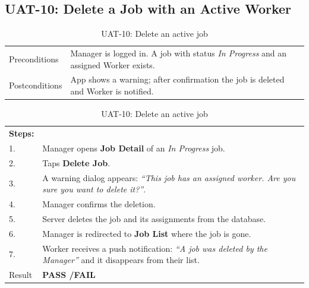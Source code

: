 \subsection*{UAT-10: Delete a Job with an Active Worker}
\begin{table}[H]
  \centering
  \begin{tabularx}{\textwidth}{lX}
    \toprule
    Preconditions  & Manager is logged in. A job with status \textit{In Progress} and an assigned Worker exists. \\
    Postconditions & App shows a warning; after confirmation the job is deleted and Worker is notified. \\
    \midrule
  \end{tabularx}
  \begin{tabularx}{\textwidth}{lX}
    \textbf{Steps:} & \\
    1. & Manager opens \textbf{Job Detail} of an \textit{In Progress} job. \\
    2. & Taps \textbf{Delete Job}. \\
    3. & A warning dialog appears: \textit{``This job has an assigned worker. Are you sure you want to delete it?''}. \\
    4. & Manager confirms the deletion. \\
    5. & Server deletes the job and its assignments from the database. \\
    6. & Manager is redirected to \textbf{Job List} where the job is gone. \\
    7. & Worker receives a push notification: \textit{``A job was deleted by the Manager''} and it disappears from their list. \\
    \midrule
    Result & \textbf{PASS \quad/\quad FAIL} \\
    \bottomrule
  \end{tabularx}
  \caption{UAT-10: Delete an active job}
\end{table}